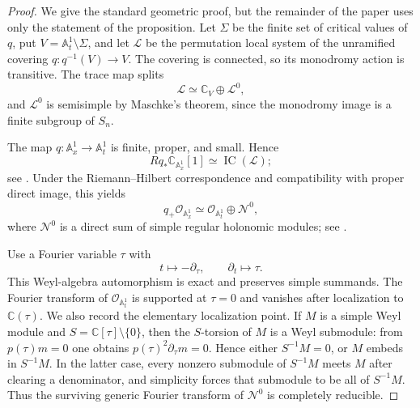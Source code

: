 \documentclass[11pt]{article}
\numberwithin{equation}{section}
\theoremstyle{definition}
\theoremstyle{remark}
\newcommand{\C}{\mathbb C}
\newcommand{\Aone}{\mathbb A^1}
\newcommand{\Ncal}{\mathcal N}
\newcommand{\Ocal}{\mathcal O}
\newcommand{\Lcal}{\mathscr L}
\begin{document}
\begin{proof}
We give the standard geometric proof, but the remainder of the paper uses only
the statement of the proposition.  Let $\Sigma$ be the finite set of critical
values of $q$, put $V=\Aone_t\setminus\Sigma$, and let $\Lcal$ be the
permutation local system of the unramified covering
$q:q^{-1}(V)\to V$.  The covering is connected, so its monodromy action is
transitive.  The trace map splits
\[
  \Lcal\simeq\C_V\oplus\Lcal^0,
\]
and $\Lcal^0$ is semisimple by Maschke's theorem, since the monodromy image is
a finite subgroup of $S_n$.

The map $q:\Aone_x\to\Aone_t$ is finite, proper, and small.  Hence
\[
  Rq_*\C_{\Aone_x}[1]\simeq\operatorname{IC}(\Lcal);
\]
see \cite[Remark~2.13]{deCataldoMigliorini}.  Under the Riemann--Hilbert
correspondence and compatibility with proper direct image, this yields
\begin{equation}\label{eq:direct-image-splitting}
  q_+\Ocal_{\Aone_x}
  \simeq
  \Ocal_{\Aone_t}\oplus\Ncal^0,
\end{equation}
where $\Ncal^0$ is a direct sum of simple regular holonomic modules; see
\cite[Sections~3.4, 7.1--7.2, and 8.2.2]{HTT}.

Use a Fourier variable $\tau$ with
\begin{equation}\label{eq:Fourier-convention}
  t\longmapsto-\partial_\tau,
  \qquad
  \partial_t\longmapsto\tau.
\end{equation}
This Weyl-algebra automorphism is exact and preserves simple summands.  The
Fourier transform of $\Ocal_{\Aone_t}$ is supported at $\tau=0$ and vanishes
after localization to $\C(\tau)$.  We also record the elementary localization
point.  If $M$ is a simple Weyl module and
$S=\C[\tau]\setminus\{0\}$, then the $S$-torsion of $M$ is a Weyl submodule:
from $p(\tau)m=0$ one obtains $p(\tau)^2\partial_\tau m=0$.  Hence either
$S^{-1}M=0$, or $M$ embeds in $S^{-1}M$.  In the latter case, every nonzero
submodule of $S^{-1}M$ meets $M$ after clearing a denominator, and simplicity
forces that submodule to be all of $S^{-1}M$.  Thus the surviving generic
Fourier transform of $\Ncal^0$ is completely reducible.


\end{proof}
\end{document}
